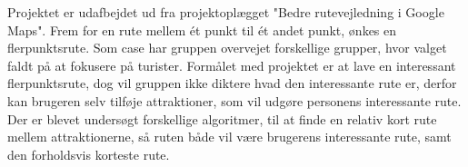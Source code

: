 Projektet er udafbejdet ud fra projektoplægget "Bedre rutevejledning i Google Maps". Frem for en rute mellem ét punkt til ét andet punkt, ønkes en flerpunktsrute. Som case har gruppen overvejet forskellige grupper, hvor valget faldt på at fokusere på turister. Formålet med projektet er at lave en interessant flerpunktsrute, dog vil gruppen ikke diktere hvad den interessante rute er, derfor kan brugeren selv tilføje attraktioner, som vil udgøre personens interessante rute. Der er blevet undersøgt forskellige algoritmer, til at finde en relativ kort rute mellem attraktionerne, så ruten både vil være brugerens interessante rute, samt den forholdsvis korteste rute.
